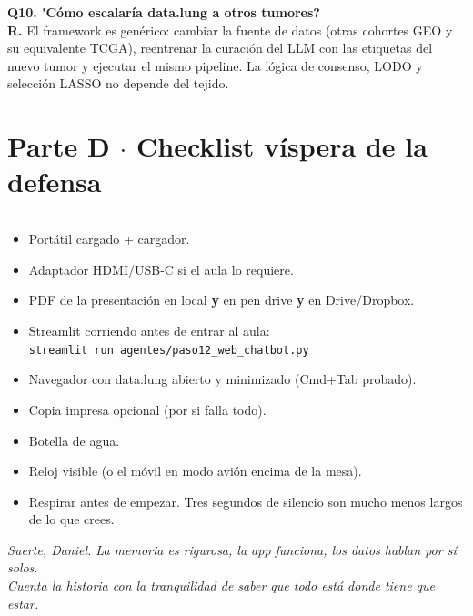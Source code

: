 \documentclass[11pt, a4paper]{article}
\begin{document}
\begin{prcaja}
\textbf{Q10. \'{}C\'omo escalar\'ia data.lung a otros tumores?}\\[4pt]
\textbf{R.} El framework es gen\'erico: cambiar la fuente de datos (otras cohortes GEO y su equivalente TCGA), reentrenar la curaci\'on del LLM con las etiquetas del nuevo tumor y ejecutar el mismo pipeline. La l\'ogica de consenso, LODO y selecci\'on LASSO no depende del tejido.
\end{prcaja}

\newpage

\section*{Parte D $\cdot$ Checklist v\'ispera de la defensa}
{\color{verdeTerm}\rule{2.5cm}{2pt}}

\medskip

\begin{itemize}[leftmargin=1.2em, itemsep=5pt, label={$\square$}]
  \item Port\'atil cargado + cargador.
  \item Adaptador HDMI/USB-C si el aula lo requiere.
  \item PDF de la presentaci\'on en local \textbf{y} en pen drive \textbf{y} en Drive/Dropbox.
  \item Streamlit corriendo antes de entrar al aula:\\ \texttt{streamlit run agentes/paso12\_web\_chatbot.py}
  \item Navegador con data.lung abierto y minimizado (Cmd+Tab probado).
  \item Copia impresa opcional (por si falla todo).
  \item Botella de agua.
  \item Reloj visible (o el m\'ovil en modo avi\'on encima de la mesa).
  \item Respirar antes de empezar. Tres segundos de silencio son mucho menos largos de lo que crees.
\end{itemize}

\vspace{2cm}

\begin{tcolorbox}[colback=plano, colframe=verdeTerm, arc=3pt, boxrule=1pt]
\centering\itshape
Suerte, Daniel. La memoria es rigurosa, la app funciona, los datos hablan por s\'i solos.\\
Cuenta la historia con la tranquilidad de saber que todo est\'a donde tiene que estar.
\end{tcolorbox}
\end{document}
